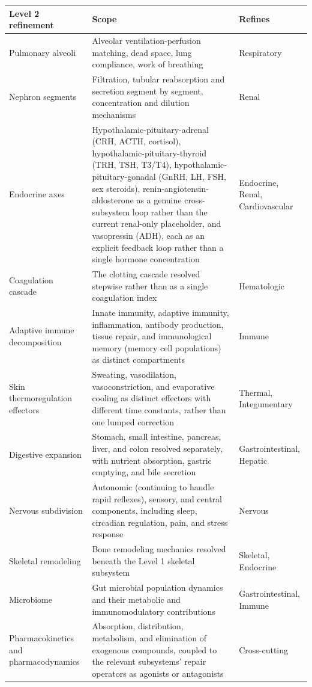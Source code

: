 \documentclass[11pt]{article}
\begin{document}
\begin{longtable}{@{}p{2.6cm}p{7.3cm}p{2.8cm}@{}}
\toprule
Level 2 refinement & Scope & Refines \\
\midrule
\endhead
Pulmonary alveoli & Alveolar ventilation-perfusion matching, dead space, lung compliance, work of breathing & Respiratory \\
Nephron segments & Filtration, tubular reabsorption and secretion segment by segment, concentration and dilution mechanisms & Renal \\
Endocrine axes & Hypothalamic-pituitary-adrenal (CRH, ACTH, cortisol), hypothalamic-pituitary-thyroid (TRH, TSH, T3/T4), hypothalamic-pituitary-gonadal (GnRH, LH, FSH, sex steroids), renin-angiotensin-aldosterone as a genuine cross-subsystem loop rather than the current renal-only placeholder, and vasopressin (ADH), each as an explicit feedback loop rather than a single hormone concentration & Endocrine, Renal, Cardiovascular \\
Coagulation cascade & The clotting cascade resolved stepwise rather than as a single coagulation index & Hematologic \\
Adaptive immune decomposition & Innate immunity, adaptive immunity, inflammation, antibody production, tissue repair, and immunological memory (memory cell populations) as distinct compartments & Immune \\
Skin thermoregulation effectors & Sweating, vasodilation, vasoconstriction, and evaporative cooling as distinct effectors with different time constants, rather than one lumped correction & Thermal, Integumentary \\
Digestive expansion & Stomach, small intestine, pancreas, liver, and colon resolved separately, with nutrient absorption, gastric emptying, and bile secretion & Gastrointestinal, Hepatic \\
Nervous subdivision & Autonomic (continuing to handle rapid reflexes), sensory, and central components, including sleep, circadian regulation, pain, and stress response & Nervous \\
Skeletal remodeling & Bone remodeling mechanics resolved beneath the Level 1 skeletal subsystem & Skeletal, Endocrine \\
Microbiome & Gut microbial population dynamics and their metabolic and immunomodulatory contributions & Gastrointestinal, Immune \\
Pharmacokinetics and pharmacodynamics & Absorption, distribution, metabolism, and elimination of exogenous compounds, coupled to the relevant subsystems' repair operators as agonists or antagonists & Cross-cutting \\

\end{longtable}
\end{document}
